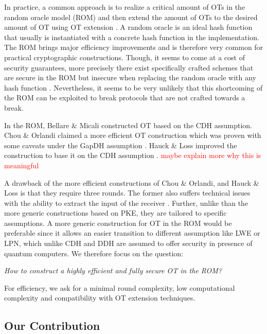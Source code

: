 In practice, a common approach is to realize a critical amount of OTs in the random oracle model (ROM) \cite{CCS:BelRog93,SODA:NaoPin01} and then extend the amount of OTs to the desired amount of OT using OT extension \cite{STOC:Beaver96a,C:IKNP03,RSA:OrrOrsSch17,EC:ALSZ15,C:KelOrsSch15}. A random oracle is an ideal hash function that usually is instantiated with a concrete hash function in the implementation. The ROM brings major efficiency improvements and is therefore very common for practical cryptographic constructions. Though, it seems to come at a cost of security guarantees, more precisely there exist specifically crafted schemes that are secure in the ROM but insecure when replacing the random oracle with any hash function \cite{STOC:CanGolHal98}. Nevertheless, it seems to be very unlikely that this shortcoming of the ROM can be exploited to break protocols that are not crafted towards a break. 

In the ROM, Bellare \& Micali \cite{C:BelMic89} constructed OT based on the CDH assumption. Chou \& Orlandi \cite{LC:ChoOrl15} claimed a more efficient OT construction which was proven with some caveats under the GapDH assumption \cite{cryptoeprint:2017:1011}. Hauck \& Loss improved the construction to base it on the CDH assumption \cite{cryptoeprint:2017:1011}. \textcolor{red}{maybe explain more why this is meaningful}

A drawback of the more efficient constructions of Chou \& Orlandi, and Hauck \& Loss is that they require three rounds. The former also suffers technical issues with the ability to extract the input of the receiver \cite{LC:ChoOrl15}. Further, unlike than the more generic constructions based on PKE, they are tailored to specific assumptions. A more generic construction for OT in the ROM would be preferable since it allows an easier transition to different assumption like LWE or LPN, which unlike CDH and DDH are assumed to offer security in presence of quantum computers. We therefore focus on the question:

\begin{center}
\emph{How to construct a highly efficient and fully secure OT in the ROM?}
\end{center}

For efficiency, we ask for a minimal round complexity, low computational complexity and compatibility with OT extension techniques.

\subsection{Our Contribution}

